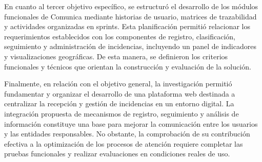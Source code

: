 En cuanto al tercer objetivo específico, se estructuró el desarrollo de los módulos funcionales de Comunica mediante historias de usuario, matrices de trazabilidad y actividades organizadas en sprints. Esta planificación permitió relacionar los requerimientos establecidos con los componentes de registro, clasificación, seguimiento y administración de incidencias, incluyendo un panel de indicadores y visualizaciones geográficas. De esta manera, se definieron los criterios funcionales y técnicos que orientan la construcción y evaluación de la solución.

Finalmente, en relación con el objetivo general, la investigación permitió fundamentar y organizar el desarrollo de una plataforma web destinada a centralizar la recepción y gestión de incidencias en un entorno digital. La integración propuesta de mecanismos de registro, seguimiento y análisis de información constituye una base para mejorar la comunicación entre los usuarios y las entidades responsables. No obstante, la comprobación de su contribución efectiva a la optimización de los procesos de atención requiere completar las pruebas funcionales y realizar evaluaciones en condiciones reales de uso.